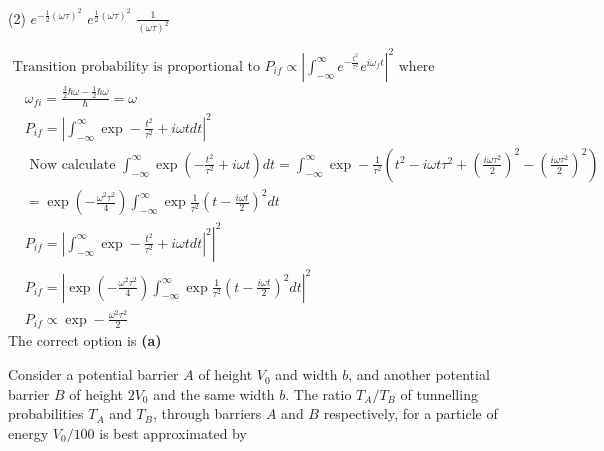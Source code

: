 \begin{enumerate}
\begin{minipage}{\textwidth}
\end{minipage}
\begin{tasks}(2)
	\task[\textbf{A.}] $e^{-\frac{1}{2}(\omega \tau)^{2}}$ 
	\task[\textbf{B.}] $e^{\frac{1}{2}(\omega \tau)^{2}}$
	\task[\textbf{D.}]$\frac{1}{(\omega \tau)^{2}}$
\end{tasks}
\begin{answer}
	$\text { Transition probability is proportional to } P_{i f} \propto\left|\int_{-\infty}^{\infty} e^{-\frac{t^{2}}{\tau^{2}}} e^{i \omega_{f} t}\right|^{2} \text { where }$\\
	$\begin{aligned}
	&\omega_{f i}=\frac{\frac{3}{2} \hbar \omega-\frac{1}{2} \hbar \omega}{\hbar}=\omega \\
	&P_{i f}=\left|\int_{-\infty}^{\infty} \exp -\frac{t^{2}}{\tau^{2}}+i \omega t d t\right|^{2}
	\end{aligned}$\\
	$\begin{aligned}
	&\text { Now calculate } \int_{-\infty}^{\infty} \exp \left(-\frac{t^{2}}{\tau^{2}}+i \omega t\right) d t=\int_{-\infty}^{\infty} \exp -\frac{1}{\tau^{2}}\left(t^{2}-i \omega t \tau^{2}+\left(\frac{i \omega \tau^{2}}{2}\right)^{2}-\left(\frac{i \omega \tau^{2}}{2}\right)^{2}\right) \\
	&=\exp \left(-\frac{\omega^{2} \tau^{2}}{4}\right) \int_{-\infty}^{\infty} \exp \frac{1}{\tau^{2}}\left(t-\frac{i \omega t}{2}\right)^{2} d t \\
	&P_{i f}=\left.\left|\int_{-\infty}^{\infty} \exp -\frac{t^{2}}{\tau^{2}}+i \omega t d t\right|^{2}\right|^{2} \\
	&P_{i f}=\left|\exp \left(-\frac{\omega^{2} \tau^{2}}{4}\right) \int_{-\infty}^{\infty} \exp \frac{1}{\tau^{2}}\left(t-\frac{i \omega t}{2}\right)^{2} d t\right|^{2} \\
	&P_{i f} \propto \exp -\frac{\omega^{2} \tau^{2}}{2}
	\end{aligned}$\\
	The correct option is \textbf{(a)}	
\end{answer}
\begin{minipage}{\textwidth}
	\item Consider a potential barrier $A$ of height $V_{0}$ and width $b$, and another potential barrier $B$ of height $2 V_{0}$ and the same width $b$. The ratio $T_{A} / T_{B}$ of tunnelling probabilities $T_{A}$ and $T_{B}$, through barriers $A$ and $B$ respectively, for a particle of energy $V_{0} / 100$ is best approximated by

\end{minipage}
\end{enumerate}
